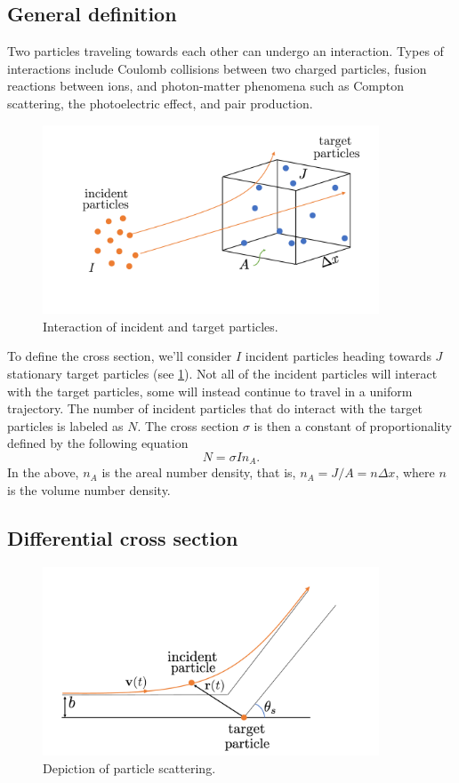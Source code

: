 \documentclass[a4paper,11pt]{report}
\begin{document}
\subsection{General definition}
Two particles traveling towards each other can undergo an interaction. Types of interactions include Coulomb collisions between two charged particles, fusion reactions between ions, and photon-matter phenomena such as Compton scattering, the photoelectric effect, and pair production.

\begin{figure}[ht]
    \centering
    \includegraphics[width=10cm]{../../images/cross_section.pdf}
    \caption{Interaction of incident and target particles.}
    \label{fig:cross_many_particles}
\end{figure}
To define the cross section, we'll consider $I$ incident particles heading towards $J$ stationary target particles (see \cref{fig:cross_many_particles}). Not all of the incident particles will interact with the target particles, some will instead continue to travel in a uniform trajectory. The number of incident particles that do interact with the target particles is labeled as $N$. The cross section $\sigma$ is then a constant of proportionality defined by the following equation
\begin{equation}
    \label{eq:cross_def}
    N = \sigma I n_A.
\end{equation}
In the above, $n_A$ is the areal number density, that is, $n_A = J / A = n \Delta x$, where $n$ is the volume number density.

\subsection{Differential cross section}
\begin{figure}[ht]
    \centering
    \includegraphics[width=10cm]{../../images/scattering.pdf}
    \caption{Depiction of particle scattering.}
    \label{fig:scattering}
\end{figure}
\end{document}
